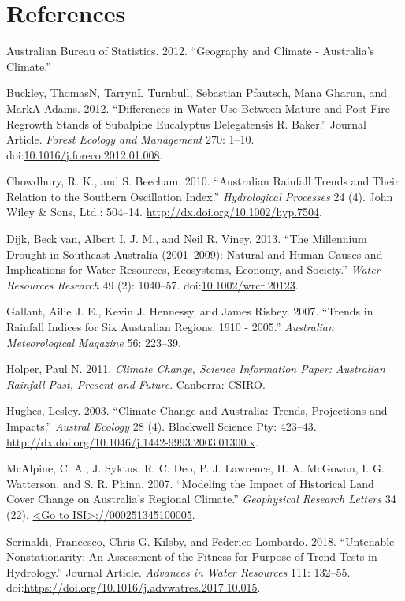 \documentclass[fleqn,10pt,lineno]{wlpeerj} %
\theoremstyle{definition}
\theoremstyle{definition}
\theoremstyle{definition}
\theoremstyle{remark}
\begin{document}
\section*{References}\label{references}

\hypertarget{refs}{}
\hypertarget{ref-ABS2012}{}
Australian Bureau of Statistics. 2012. ``Geography and Climate -
Australia's Climate.''

\hypertarget{ref-buckley2012}{}
Buckley, ThomasN, TarrynL Turnbull, Sebastian Pfautsch, Mana Gharun, and
MarkA Adams. 2012. ``Differences in Water Use Between Mature and
Post-Fire Regrowth Stands of Subalpine Eucalyptus Delegatensis R.
Baker.'' Journal Article. \emph{Forest Ecology and Management} 270:
1--10.
doi:\href{https://doi.org/10.1016/j.foreco.2012.01.008}{10.1016/j.foreco.2012.01.008}.

\hypertarget{ref-Chowdhury2010}{}
Chowdhury, R. K., and S. Beecham. 2010. ``Australian Rainfall Trends and
Their Relation to the Southern Oscillation Index.'' \emph{Hydrological
Processes} 24 (4). John Wiley \& Sons, Ltd.: 504--14.
\url{http://dx.doi.org/10.1002/hyp.7504}.

\hypertarget{ref-vanDijk2013}{}
Dijk, Beck van, Albert I. J. M., and Neil R. Viney. 2013. ``The
Millennium Drought in Southeast Australia (2001--2009): Natural and
Human Causes and Implications for Water Resources, Ecosystems, Economy,
and Society.'' \emph{Water Resources Research} 49 (2): 1040--57.
doi:\href{https://doi.org/10.1002/wrcr.20123}{10.1002/wrcr.20123}.

\hypertarget{ref-Gallant2007}{}
Gallant, Ailie J. E., Kevin J. Hennessy, and James Risbey. 2007.
``Trends in Rainfall Indices for Six Australian Regions: 1910 - 2005.''
\emph{Australian Meteorological Magazine} 56: 223--39.

\hypertarget{ref-Holper2011}{}
Holper, Paul N. 2011. \emph{Climate Change, Science Information Paper:
Australian Rainfall-Past, Present and Future}. Canberra: CSIRO.

\hypertarget{ref-Hughes2003}{}
Hughes, Lesley. 2003. ``Climate Change and Australia: Trends,
Projections and Impacts.'' \emph{Austral Ecology} 28 (4). Blackwell
Science Pty: 423--43.
\url{http://dx.doi.org/10.1046/j.1442-9993.2003.01300.x}.

\hypertarget{ref-McAlpine2007}{}
McAlpine, C. A., J. Syktus, R. C. Deo, P. J. Lawrence, H. A. McGowan, I.
G. Watterson, and S. R. Phinn. 2007. ``Modeling the Impact of Historical
Land Cover Change on Australia's Regional Climate.'' \emph{Geophysical
Research Letters} 34 (22).
\href{\%3CGo\%20to\%20ISI\%3E://000251345100005}{\textless{}Go to ISI\textgreater{}://000251345100005}.

\hypertarget{ref-serinaldi2018}{}
Serinaldi, Francesco, Chris G. Kilsby, and Federico Lombardo. 2018.
``Untenable Nonstationarity: An Assessment of the Fitness for Purpose of
Trend Tests in Hydrology.'' Journal Article. \emph{Advances in Water
Resources} 111: 132--55.
doi:\href{https://doi.org/https://doi.org/10.1016/j.advwatres.2017.10.015}{https://doi.org/10.1016/j.advwatres.2017.10.015}.
\end{document}
